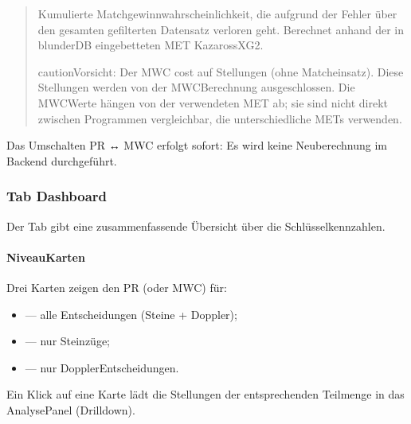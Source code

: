 \documentclass[letterpaper,10pt,german]{sphinxmanual}
\begin{document}
\sphinxAtStartPar
{}
\begin{quote}

\sphinxAtStartPar
Kumulierte Matchgewinnwahrscheinlichkeit, die aufgrund der Fehler über den gesamten gefilterten Datensatz verloren geht. Berechnet anhand der in blunderDB eingebetteten MET Kazaross\sphinxhyphen{}XG2.

\begin{sphinxadmonition}{caution}{Vorsicht:}
\sphinxAtStartPar
Der MWC cost  auf \sphinxhyphen{}Stellungen (ohne Matcheinsatz). Diese Stellungen werden von der MWC\sphinxhyphen{}Berechnung ausgeschlossen. Die MWC\sphinxhyphen{}Werte hängen von der verwendeten MET ab; sie sind nicht direkt zwischen Programmen vergleichbar, die unterschiedliche METs verwenden.
\end{sphinxadmonition}
\end{quote}

\sphinxAtStartPar
Das Umschalten PR ↔ MWC erfolgt sofort: Es wird keine Neuberechnung im Backend durchgeführt.


\subsubsection{Tab Dashboard}
\label{\detokenize{manuel:onglet-dashboard}}
\sphinxAtStartPar
Der Tab  gibt eine zusammenfassende Übersicht über die Schlüsselkennzahlen.


\paragraph{Niveau\sphinxhyphen{}Karten}
\label{\detokenize{manuel:cartes-de-niveau}}
\sphinxAtStartPar
Drei Karten zeigen den PR (oder MWC) für:
\begin{itemize}
\item {} 
\sphinxAtStartPar
{} — alle Entscheidungen (Steine + Doppler);

\item {} 
\sphinxAtStartPar
{} — nur Steinzüge;

\item {} 
\sphinxAtStartPar
{} — nur Doppler\sphinxhyphen{}Entscheidungen.

\end{itemize}

\sphinxAtStartPar
Ein Klick auf eine Karte lädt die Stellungen der entsprechenden Teilmenge in das Analyse\sphinxhyphen{}Panel (Drill\sphinxhyphen{}down).
\end{document}
